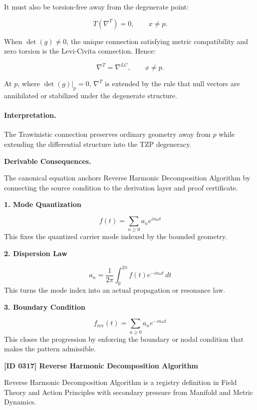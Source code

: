 It must also be torsion-free away from the degenerate point:

\begin{equation}
T(\nabla^{T})=0,
\qquad x\neq p .
\end{equation}

When $\det(g)\neq 0$, the unique connection satisfying metric compatibility and zero torsion is the Levi-Civita connection. Hence:

\begin{equation}
\nabla^{T}=\nabla^{LC},
\qquad x\neq p .
\end{equation}

At $p$, where $\det(g)|_p=0$, $\nabla^{T}$ is extended by the rule that null vectors are annihilated or stabilized under the degenerate structure.

\paragraph{Interpretation.}
The Trawinistic connection preserves ordinary geometry away from $p$ while extending the differential structure into the TZP degeneracy.

\par\vspace{0.35em}
\noindent\textbf{Derivable Consequences.}\quad
\begingroup
\footnotesize
\raggedright
The canonical equation anchors Reverse Harmonic Decomposition Algorithm by connecting the source condition to the derivation layer and proof certificate.
\par\endgroup

\noindent\textbf{1. Mode Quantization}\par
\[
f(t)=\sum_{n\geq0} a_n e^{in\omega t}
\]
\noindent This fixes the quantized carrier mode indexed by the bounded geometry.\par
\noindent\textbf{2. Dispersion Law}\par
\[
a_n=\frac{1}{2\pi}\int_0^{2\pi} f(t)e^{-in\omega t}\,dt
\]
\noindent This turns the mode index into an actual propagation or resonance law.\par
\noindent\textbf{3. Boundary Condition}\par
\[
f_{\mathrm{rev}}(t)=\sum_{n\geq0}a_n e^{-in\omega t}
\]
\noindent This closes the progression by enforcing the boundary or nodal condition that makes the pattern admissible.\par

\clearpage
\noindent\textbf{[ID 0317] Reverse Harmonic Decomposition Algorithm}\par
\vspace{0.35em}
\begingroup\small
{}
Reverse Harmonic Decomposition Algorithm is a registry definition in Field Theory and Action Principles with secondary pressure from Manifold and Metric Dynamics.

